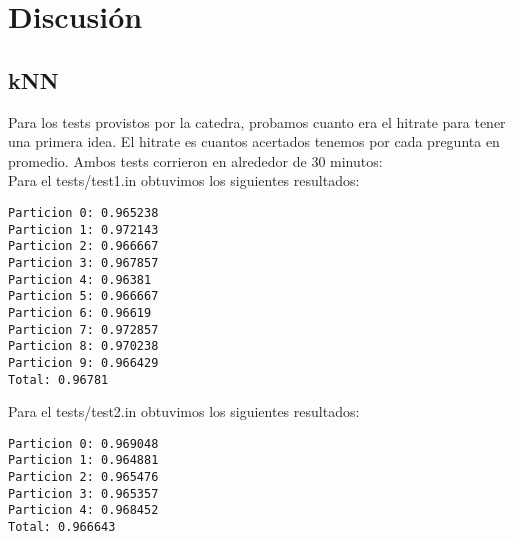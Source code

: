 \section{Discusi\'on}

\subsection{kNN}

Para los tests provistos por la catedra, probamos cuanto era el hitrate para tener una primera idea. El hitrate es cuantos acertados tenemos por cada pregunta en promedio. Ambos tests corrieron en alrededor de 30 minutos:\\

Para el tests/test1.in obtuvimos los siguientes resultados:
\begin{verbatim}
Particion 0: 0.965238
Particion 1: 0.972143
Particion 2: 0.966667
Particion 3: 0.967857
Particion 4: 0.96381
Particion 5: 0.966667
Particion 6: 0.96619
Particion 7: 0.972857
Particion 8: 0.970238
Particion 9: 0.966429
Total: 0.96781
\end{verbatim}

Para el tests/test2.in obtuvimos los siguientes resultados:

\begin{verbatim}
Particion 0: 0.969048
Particion 1: 0.964881
Particion 2: 0.965476
Particion 3: 0.965357
Particion 4: 0.968452
Total: 0.966643
\end{verbatim}